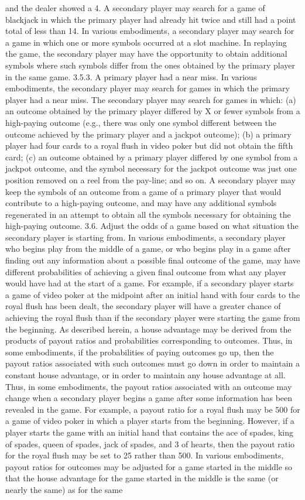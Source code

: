 \documentclass[11pt,a4paper]{article}
\begin{document}
and the dealer showed a 4. A secondary player may search for a game of blackjack in which the primary player had already hit twice and still had a point total of less than 14. In various embodiments, a secondary player may search for a game in which one or more symbols occurred at a slot machine. In replaying the game, the secondary player may have the opportunity to obtain additional symbols where such symbols differ from the ones obtained by the primary player in the same game. 3.5.3. A primary player had a near miss. In various embodiments, the secondary player may search for games in which the primary player had a near miss. The secondary player may search for games in which: (a) an outcome obtained by the primary player differed by X or fewer symbols from a high-paying outcome (e.g., there was only one symbol different between the outcome achieved by the primary player and a jackpot outcome); (b) a primary player had four cards to a royal flush in video poker but did not obtain the fifth card; (c) an outcome obtained by a primary player differed by one symbol from a jackpot outcome, and the symbol necessary for the jackpot outcome was just one position removed on a reel from the pay-line; and so on. A secondary player may keep the symbols of an outcome from a game of a primary player that would contribute to a high-paying outcome, and may have any additional symbols regenerated in an attempt to obtain all the symbols necessary for obtaining the high-paying outcome. 3.6. Adjust the odds of a game based on what situation the secondary player is starting from. In various embodiments, a secondary player who begins play from the middle of a game, or who begins play in a game after finding out any information about a possible final outcome of the game, may have different probabilities of achieving a given final outcome from what any player would have had at the start of a game. For example, if a secondary player starts a game of video poker at the midpoint after an initial hand with four cards to the royal flush has been dealt, the secondary player will have a greater chance of achieving the royal flush than if the secondary player were starting the game from the beginning. As described herein, a house advantage may be derived from the products of payout ratios and probabilities corresponding to outcomes. Thus, in some embodiments, if the probabilities of paying outcomes go up, then the payout ratios associated with such outcomes must go down in order to maintain a constant house advantage, or in order to maintain any house advantage at all. Thus, in some embodiments, the payout ratios associated with an outcome may change when a secondary player begins a game after some information has been revealed in the game. For example, a payout ratio for a royal flush may be 500 for a game of video poker in which a player starts from the beginning. However, if a player starts the game with an initial hand that contains the ace of spades, king of spades, queen of spades, jack of spades, and 3 of hearts, then the payout ratio for the royal flush may be set to 25 rather than 500. In various embodiments, payout ratios for outcomes may be adjusted for a game started in the middle so that the house advantage for the game started in the middle is the same (or nearly the same) as for the same 
\end{document}
